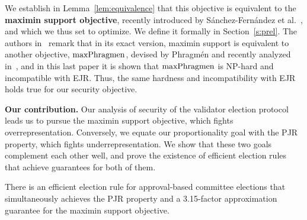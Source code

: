 We establish in Lemma~\ref{lem:equivalence} that this objective is equivalent to the \textbf{maximin support objective}, recently introduced by Sánchez-Fernández et al.~\cite{sanchez2016maximin}, and which we thus set to optimize. 
We define it formally in Section~\ref{s:prel}.
The authors in~\cite{sanchez2016maximin} remark that in its exact version, maximin support is equivalent to another objective, $\operatorname{maxPhragmen}$, devised by Phragm\'{e}n and recently analyzed in~\cite{brill2017phragmen}, and in this last paper it is shown that $\operatorname{maxPhragmen}$ is NP-hard and incompatible with EJR. 
Thus, the same hardness and incompatibility with EJR holds true for our security objective. 

\vspace{5mm}
\textbf{Our contribution.}
Our analysis of security of the validator election protocol leads us to pursue the maximin support objective, which fights overrepresentation. Conversely, we equate our proportionality goal with the PJR property, which fights underrepresentation. We show that these two goals complement each other well, and prove the existence of efficient election rules that achieve guarantees for both of them. 

\begin{theorem}\label{thm:intro1}
There is an efficient election rule for approval-based committee elections that simultaneously achieves the PJR property and a 3.15-factor approximation guarantee for the maximin support objective.
\end{theorem}

